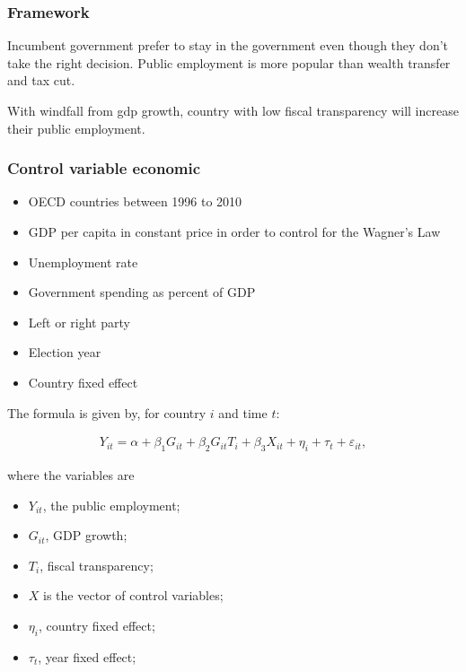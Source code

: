\subsubsection{Framework}\label{framework}

Incumbent government prefer to stay in the government even though they
don't take the right decision. Public employment is more popular than
wealth transfer and tax cut.

With windfall from gdp growth, country with low fiscal transparency will
increase their public employment.

\subsubsection{Control variable
economic}\label{control-variable-economic}

\begin{itemize}
\itemsep1pt\parskip0pt
\item
  OECD countries between 1996 to 2010
\item
  GDP per capita in constant price in order to control for the Wagner's
  Law
\item
  Unemployment rate
\item
  Government spending as percent of GDP
\item
  Left or right party
\item
  Election year
\item
  Country fixed effect
\end{itemize}

The formula is given by, for country \(i\) and time \(t\):

\begin{align*}
Y_{it} = \alpha + \beta_1 G_{it} + \beta_2 G_{it} T_i + \beta_3 X_{it} + \eta_i + \tau_t + \varepsilon_{it},
\end{align*}

where the variables are

\begin{itemize}
\itemsep1pt\parskip0pt
\item
  \(Y_{it}\), the public employment;
\item
  \(G_{it}\), GDP growth;
\item
  \(T_{i}\), fiscal transparency;
\item
  \(X\) is the vector of control variables;
\item
  \(\eta_i\), country fixed effect;
\item
  \(\tau_t\), year fixed effect;
\end{itemize}

